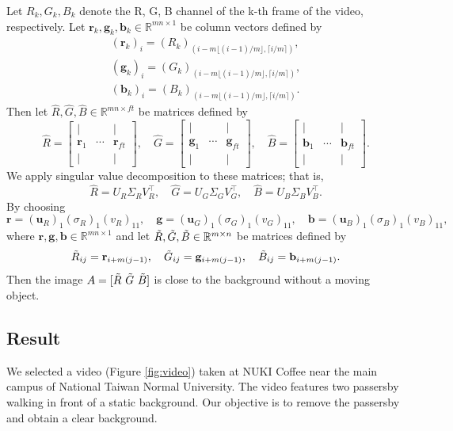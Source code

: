 \documentclass[12pt]{article}
\theoremstyle{definition}
\begin{document}
Let $R_k,G_k,B_k$ denote the R, G, B channel of the k-th frame of the video, respectively. Let $\mathbf{r}_k, \mathbf{g}_k, \mathbf{b}_k \in\mathbb{R}^{mn\times 1}$ be column vectors defined by
\begin{align*}
    (\mathbf{r}_k)_i = (R_k)_{(i-m\lfloor (i-1)/m\rfloor, \lceil i/m\rceil)}, \\
    (\mathbf{g}_k)_i = (G_k)_{(i-m\lfloor (i-1)/m\rfloor, \lceil i/m\rceil)}, \\
    (\mathbf{b}_k)_i = (B_k)_{(i-m\lfloor (i-1)/m\rfloor, \lceil i/m\rceil)}.
\end{align*}
Then let $\hat{R},\hat{G},\hat{B}\in\mathbb{R}^{mn\times ft}$ be matrices defined by
\[ \hat{R} = 
\begin{bmatrix}
    | & & | \\
    \mathbf{r}_1 & \cdots & \mathbf{r}_{ft} \\
    | & & |
\end{bmatrix}
, \quad\hat{G} = 
\begin{bmatrix}
    | & & | \\
    \mathbf{g}_1 & \cdots & \mathbf{g}_{ft} \\
    | & & | 
\end{bmatrix}
, \quad\hat{B} = 
\begin{bmatrix}
    | & & | \\
    \mathbf{b}_1 & \cdots & \mathbf{b}_{ft} \\
    | & & |
\end{bmatrix}
.
\]
We apply singular value decomposition to these matrices; that is,
\[ \hat{R} = U_R \Sigma_R V^\top_R, \quad
\hat{G} = U_G \Sigma_G V^\top_G,\quad
\hat{B} = U_B \Sigma_B V^\top_B.
\]
By choosing 
\[ \mathbf{r} = (\mathbf{u}_R)_1 (\sigma_R)_1 (v_R)_{11},
\quad \mathbf{g} = (\mathbf{u}_G)_1 (\sigma_G)_1 (v_G)_{11},
\quad \mathbf{b} = (\mathbf{u}_B)_1 (\sigma_B)_1 (v_B)_{11},
\]
where $\mathbf{r},\mathbf{g},\mathbf{b}\in\mathbb{R}^{mn\times 1}$ and let $\Tilde{R},\Tilde{G},\Tilde{B}\in\mathbb{R}^{m\times n}$ be matrices defined by
\[ \Tilde{R}_{ij} = \mathbf{r}_{i+m(j-1)}, \quad
\Tilde{G}_{ij} = \mathbf{g}_{i+m(j-1)}, \quad
\Tilde{B}_{ij} = \mathbf{b}_{i+m(j-1)}.
\]
Then the image $A = [\Tilde{R}\ \Tilde{G}\ \Tilde{B}]$ is close to the background without a moving object.

\subsection{Result}
We selected a video (Figure \ref{fig:video}) taken at NUKI Coffee near the main campus of National Taiwan Normal University. The video features two passersby walking in front of a static background. Our objective is to remove the passersby and obtain a clear background.
\end{document}
